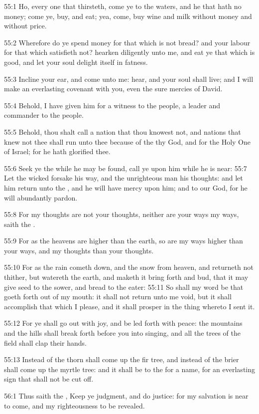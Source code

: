 55:1 Ho, every one that thirsteth, come ye to the waters, and he that hath no money; come ye, buy, and eat; yea, come, buy wine and milk without money and without price.

55:2 Wherefore do ye spend money for that which is not bread? and your labour for that which satisfieth not? hearken diligently unto me, and eat ye that which is good, and let your soul delight itself in fatness.

55:3 Incline your ear, and come unto me: hear, and your soul shall live; and I will make an everlasting covenant with you, even the sure mercies of David.

55:4 Behold, I have given him for a witness to the people, a leader and commander to the people.

55:5 Behold, thou shalt call a nation that thou knowest not, and nations that knew not thee shall run unto thee because of the \LORD thy God, and for the Holy One of Israel; for he hath glorified thee.

55:6 Seek ye the \LORD while he may be found, call ye upon him while he is near: 55:7 Let the wicked forsake his way, and the unrighteous man his thoughts: and let him return unto the \LORD, and he will have mercy upon him; and to our God, for he will abundantly pardon.

55:8 For my thoughts are not your thoughts, neither are your ways my ways, saith the \LORD.

55:9 For as the heavens are higher than the earth, so are my ways higher than your ways, and my thoughts than your thoughts.

55:10 For as the rain cometh down, and the snow from heaven, and returneth not thither, but watereth the earth, and maketh it bring forth and bud, that it may give seed to the sower, and bread to the eater: 55:11 So shall my word be that goeth forth out of my mouth: it shall not return unto me void, but it shall accomplish that which I please, and it shall prosper in the thing whereto I sent it.

55:12 For ye shall go out with joy, and be led forth with peace: the mountains and the hills shall break forth before you into singing, and all the trees of the field shall clap their hands.

55:13 Instead of the thorn shall come up the fir tree, and instead of the brier shall come up the myrtle tree: and it shall be to the \LORD for a name, for an everlasting sign that shall not be cut off.

56:1 Thus saith the \LORD, Keep ye judgment, and do justice: for my salvation is near to come, and my righteousness to be revealed.

